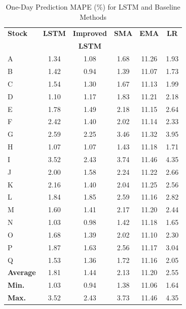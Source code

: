 \documentclass[10pt,twocolumn]{article}
\begin{document}
\begin{table}[htbp]
    \centering
    \scriptsize %
    \setlength{\tabcolsep}{4pt} %
    \caption{One-Day Prediction MAPE (\%) for LSTM and Baseline Methods}
    \label{tab:one_day_mape}
    \begin{tabular}{|l|c|c|c|c|c|}
        \hline
        \textbf{Stock} & \textbf{LSTM} & \multicolumn{1}{|c|}{\textbf{Improved}} & \textbf{SMA} & \textbf{EMA} & \textbf{LR} \\
                      &               & \multicolumn{1}{|c|}{\textbf{LSTM}}     &              &              &              \\
        \hline
        A   & 1.34 & 1.08 & 1.68 & 11.26 & 1.93 \\
        B     & 1.42 & 0.94 & 1.39 & 11.07 & 1.73 \\
        C   & 1.54 & 1.30 & 1.67 & 11.13 & 1.99 \\
        D    & 1.10 & 1.17 & 1.83 & 11.21 & 2.18 \\
        E    & 1.78 & 1.49 & 2.18 & 11.15 & 2.64 \\
        F    & 2.42 & 1.40 & 2.02 & 11.14 & 2.33 \\
        G    & 2.59 & 2.25 & 3.46 & 11.32 & 3.95 \\
        H     & 1.07 & 1.07 & 1.43 & 11.18 & 1.71 \\
        I   & 3.52 & 2.43 & 3.74 & 11.46 & 4.35 \\
        J  & 2.00 & 1.58 & 2.24 & 11.22 & 2.66 \\
        K   & 2.16 & 1.40 & 2.04 & 11.25 & 2.56 \\
        L    & 1.84 & 1.85 & 2.59 & 11.16 & 2.82 \\
        M    & 1.60 & 1.41 & 2.17 & 11.20 & 2.44 \\
        N  & 1.03 & 0.98 & 1.42 & 11.18 & 1.65 \\
        O    & 1.68 & 1.39 & 2.02 & 11.10 & 2.30 \\
        P    & 1.87 & 1.63 & 2.56 & 11.17 & 3.04 \\
        Q    & 1.53 & 1.36 & 1.72 & 11.16 & 2.05 \\
        \hline
        \textbf{Average} & 1.81 & 1.44 & 2.13 & 11.20 & 2.55 \\
        \textbf{Min.}    & 1.03 & 0.94 & 1.38 & 11.06 & 1.64 \\
        \textbf{Max.}    & 3.52 & 2.43 & 3.73 & 11.46 & 4.35 \\
        \hline
    \end{tabular}
\end{table}
\end{document}
